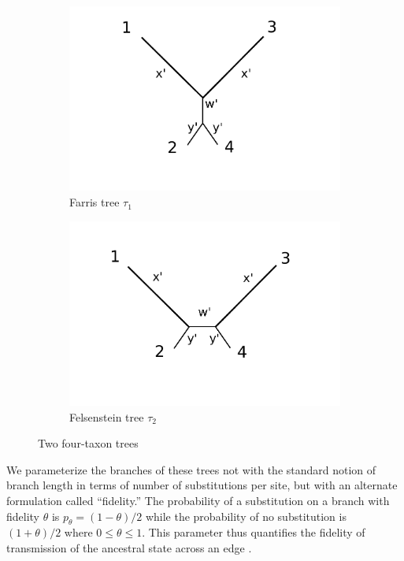 \documentclass{article}
\begin{document}
\begin{figure}
\centering
\begin{subfigure}{.45\linewidth}
\centering
\includegraphics[width=\textwidth]{farris_blank}
\caption[short]{Farris tree $\tau_1$}
\end{subfigure}
\begin{subfigure}{.45\linewidth}
\centering
\includegraphics[width=\textwidth]{felsenstein_blank}
\caption[short]{Felsenstein tree $\tau_2$}
\end{subfigure}
\caption{Two four-taxon trees}
\label{fig:farris-fels-top}
\end{figure}

We parameterize the branches of these trees not with the standard notion of branch length in terms of number of substitutions per site, but with an alternate formulation called ``fidelity.''
The probability of a substitution on a branch with fidelity $\theta$ is $p_\theta = (1-\theta)/2$ while the probability of no substitution is $(1+\theta)/2$ where $0 \le \theta \le 1$.
This parameter thus quantifies the fidelity of transmission of the ancestral state across an edge \cite{Matsen2007-jq}.
\end{document}
